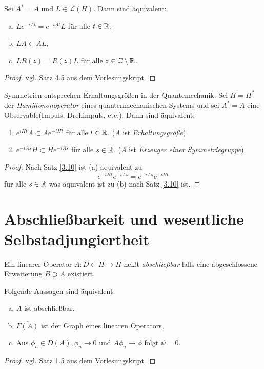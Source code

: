 \documentclass{mycourse}
\begin{document}
\begin{st}\label{3.10}
Sei $A^*=A$ und $L\in \mathcal L(H)$. Dann sind äquivalent:
\begin{enumerate}[a)]
\item $Le^{-iAt} = e^{-iAt} L$ für alle $t\in \mathbb{R}$,
\item $LA \subset AL$,
\item $LR(z) = R(z) L$ für alle $z\in \mathbb{C}\setminus \mathbb{R}$.
\end{enumerate}
\end{st}
\begin{proof}
vgl. Satz 4.5 aus dem Vorlesungskript.
\end{proof}
\begin{seg}[Anwendungen]
Symmetrien entsprechen Erhaltungsgrößen in der Quantemechanik. Sei $H=H^*$ der \emph{Hamiltononoperator} eines quantenmechanischen Systems und sei $A^*=A$ eine Observable(Impuls, Drehimpuls, etc.). Dann sind äquivalent:
\begin{enumerate}
\item $e^{iHt}A\subset A e^{-iHt}$ für alle $t\in \mathbb{R}$. ($A$ ist \emph{Erhaltungsgröße})
\item $e^{-iAs} H \subset H e^{-iAs}$ für alle $s\in \mathbb{R}$. ($A$ ist \emph{Erzeuger einer Symmetriegruppe})
\end{enumerate}
\begin{proof}
Nach Satz \ref{3.10}  ist (a) äquivalent zu 
\[
e^{-iHt} e^{-iAs} = e^{-iAs} e^{-iHt}
\]
für alle $s\in \mathbb{R}$ was äquivalent ist zu (b) nach Satz \ref{3.10} ist.
\end{proof}
\end{seg}

\section{Abschließbarkeit und wesentliche Selbstadjungiertheit}

Ein linearer Operator $A:D\subset H\to H$ heißt \emph{abschließbar} falls eine abgeschlossene Erweiterung $B\supset A$ existiert.

\begin{st}\label{3.11}
Folgende Aussagen sind äquivalent:
\begin{enumerate}[a)]
\item $A$ ist abschließbar,
\item $\overline{\Gamma(A)}$ ist der Graph eines linearen Operators,
\item Aus $\phi_n\in D(A), \phi_n \to 0$ und $A\phi_n \to \phi$ folgt $\psi=0$.
\end{enumerate}
\end{st}
\begin{proof}
vgl. Satz 1.5 aus dem Vorlesungskript.
\end{proof}
\end{document}
